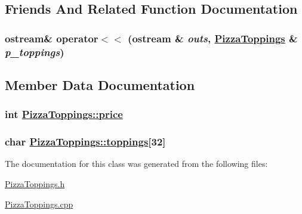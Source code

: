 \subsection{Friends And Related Function Documentation}
\hypertarget{class_pizza_toppings_d82a6ac0fb2196d7430f04944d9135d4}{
\subsubsection[operator$<$$<$]{\setlength{\rightskip}{0pt plus 5cm}ostream\& operator$<$$<$ (ostream \& {\em outs}, \hyperlink{class_pizza_toppings}{Pizza\-Toppings} \& {\em p\_\-toppings})}}
\label{class_pizza_toppings_d82a6ac0fb2196d7430f04944d9135d4}




\subsection{Member Data Documentation}
\hypertarget{class_pizza_toppings_78a5eb43deef9a7b5b9ce157b9d52ac4}{
\subsubsection[price]{\setlength{\rightskip}{0pt plus 5cm}int \hyperlink{class_pizza_toppings_78a5eb43deef9a7b5b9ce157b9d52ac4}{Pizza\-Toppings::price}}}
\label{class_pizza_toppings_78a5eb43deef9a7b5b9ce157b9d52ac4}


\hypertarget{class_pizza_toppings_d65a29390afb76fef45b1e9225e2b6ed}{
\subsubsection[toppings]{\setlength{\rightskip}{0pt plus 5cm}char \hyperlink{class_pizza_toppings_d65a29390afb76fef45b1e9225e2b6ed}{Pizza\-Toppings::toppings}\mbox{[}32\mbox{]}}}
\label{class_pizza_toppings_d65a29390afb76fef45b1e9225e2b6ed}




The documentation for this class was generated from the following files:\begin{CompactItemize}
\item 
\hyperlink{_pizza_toppings_8h}{Pizza\-Toppings.h}\item 
\hyperlink{_pizza_toppings_8cpp}{Pizza\-Toppings.cpp}\end{CompactItemize}
